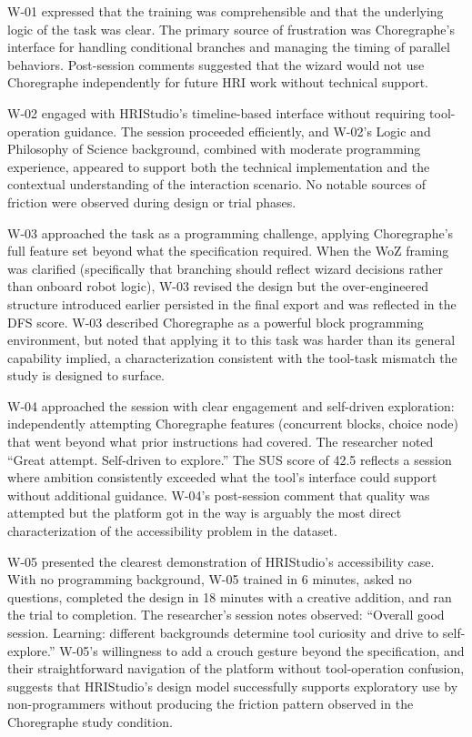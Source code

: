 W-01 expressed that the training was comprehensible and that the underlying logic of the task was clear. The primary source of frustration was Choregraphe's interface for handling conditional branches and managing the timing of parallel behaviors. Post-session comments suggested that the wizard would not use Choregraphe independently for future HRI work without technical support.

W-02 engaged with HRIStudio's timeline-based interface without requiring tool-operation guidance. The session proceeded efficiently, and W-02's Logic and Philosophy of Science background, combined with moderate programming experience, appeared to support both the technical implementation and the contextual understanding of the interaction scenario. No notable sources of friction were observed during design or trial phases.

W-03 approached the task as a programming challenge, applying Choregraphe's full feature set beyond what the specification required. When the WoZ framing was clarified (specifically that branching should reflect wizard decisions rather than onboard robot logic), W-03 revised the design but the over-engineered structure introduced earlier persisted in the final export and was reflected in the DFS score. W-03 described Choregraphe as a powerful block programming environment, but noted that applying it to this task was harder than its general capability implied, a characterization consistent with the tool-task mismatch the study is designed to surface.

W-04 approached the session with clear engagement and self-driven exploration: independently attempting Choregraphe features (concurrent blocks, choice node) that went beyond what prior instructions had covered. The researcher noted ``Great attempt. Self-driven to explore.'' The SUS score of 42.5 reflects a session where ambition consistently exceeded what the tool's interface could support without additional guidance. W-04's post-session comment that quality was attempted but the platform got in the way is arguably the most direct characterization of the accessibility problem in the dataset.

W-05 presented the clearest demonstration of HRIStudio's accessibility case. With no programming background, W-05 trained in 6 minutes, asked no questions, completed the design in 18 minutes with a creative addition, and ran the trial to completion. The researcher's session notes observed: ``Overall good session. Learning: different backgrounds determine tool curiosity and drive to self-explore.'' W-05's willingness to add a crouch gesture beyond the specification, and their straightforward navigation of the platform without tool-operation confusion, suggests that HRIStudio's design model successfully supports exploratory use by non-programmers without producing the friction pattern observed in the Choregraphe study condition.

